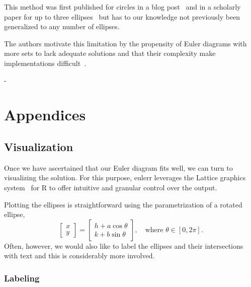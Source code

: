 \documentclass[
  oneside,
  openany,
  numbers=noendperiod,
  parskip=half,
  bibliography=totoc
]{scrbook}\usepackage[]{graphicx}\usepackage{xcolor}
\newlength{\overhang}
\newenvironment{fullwidth}{
  \begin{addmargin*}[0em]{-\overhang}
  }{
  \end{addmargin*}
}
\newcommand{\pkg}[1]{{\fontseries{b}\selectfont #1}}
\begin{document}
This method was first published for circles in a blog
post~\citep{frederickson_2013} and in a scholarly paper for up to three
ellipses~\citep{micallef_2014a} but has to our knowledge not previously been
generalized to any number of ellipses.

The authors motivate this limitation by the propensity of Euler diagrams with
more sets to lack adequate solutions and that their complexity make
implementations difficult~\citep{micallef_2013}.
\begin{fullwidth}
\part*{Appendices}
\end{fullwidth}
\appendix
\chapter{Visualization}
\label{ap:visualization}

Once we have ascertained that our Euler diagram fits well, we can turn to
visualizing the solution. For this purpose, \pkg{eulerr} leverages the
\pkg{Lattice} graphics system~\citep{sarkar_2008} for R to offer intuitive and
granular control over the output.

Plotting the ellipses is straightforward using the parametrization of a rotated
ellipse,
%
\begin{equation*}
\begin{bmatrix}
  x \\ y
\end{bmatrix} =
\begin{bmatrix}
  h + a \cos{\theta} \\
  k + b \sin{\theta}
\end{bmatrix},\quad \text{where } \theta \in [0, 2\pi].
\end{equation*}
%
Often, however, we would also like to label the ellipses and their intersections
with text and this is considerably more involved.

\section{Labeling}
\label{sec:labeling}
\end{document}
